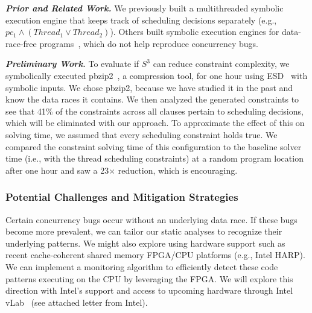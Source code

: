 \noindent \textit{\textbf{Prior and Related Work.}} We previously built a multithreaded symbolic execution engine that keeps track of scheduling decisions separately (e.g., $pc_1 \wedge (Thread_1 \vee Thread_2)$). Others built symbolic execution engines for data-race-free programs~\cite{symbexmt}, which do not help reproduce concurrency bugs. 


\noindent \textit{\textbf{Preliminary Work.}} To evaluate if $S^3$ can reduce constraint complexity, we symbolically executed pbzip2~\cite{pbzip2}, a compression tool, for one hour using ESD~\cite{esd} with symbolic inputs. We chose pbzip2, because we have studied it in the past and know the data races it contains. We then analyzed the generated constraints to see that 41\% of the constraints across all clauses pertain to scheduling decisions, which will be eliminated with our approach. To approximate the effect of this on solving time, we assumed that every scheduling constraint holds true. We compared the constraint solving time of this configuration to the baseline solver time (i.e., with the thread scheduling constraints) at a random program location after one hour and saw a 23$\times$ reduction, which is encouraging.

\subsubsection{Potential Challenges and Mitigation Strategies}
\label{sec:mitigation2}

Certain concurrency bugs occur without an underlying data race. If these bugs become more prevalent, we can tailor our static analyses to recognize their underlying patterns. We might also explore using hardware support such as recent cache-coherent shared memory FPGA/CPU platforms (e.g., Intel HARP). We can implement a monitoring algorithm to efficiently detect these code patterns executing on the CPU by leveraging the FPGA. We will explore this direction with Intel's support and access to upcoming hardware through Intel vLab~\cite{vlab} (see attached letter from Intel).

